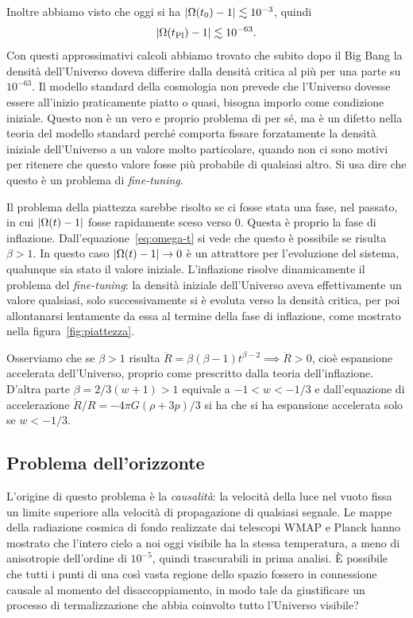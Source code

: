 Inoltre abbiamo visto che oggi si ha \(\lvert\Omega(t_{0}) - 1\rvert \lesssim
10^{-3}\), quindi
\begin{equation}
  \lvert\Omega(t_{\textup{Pl}}) - 1\rvert \lesssim 10^{-63}.
\end{equation}
Con questi approssimativi calcoli abbiamo trovato che subito dopo il Big Bang la
densità dell'Universo doveva differire dalla densità critica al più per una
parte su \(10^{-63}\).  Il modello standard della cosmologia non prevede che
l'Universo dovesse essere all'inizio praticamente piatto o quasi, bisogna
imporlo come condizione iniziale.  Questo non è un vero e proprio problema di
per sé, ma è un difetto nella teoria del modello standard perché comporta
fissare forzatamente la densità iniziale dell'Universo a un valore molto
particolare, quando non ci sono motivi per ritenere che questo valore fosse più
probabile di qualsiasi altro.  Si usa dire che questo è un problema di
\emph{fine-tuning}.

Il problema della piattezza sarebbe risolto se ci fosse stata una fase, nel
passato, in cui \(\lvert\Omega(t) - 1\rvert\) fosse rapidamente sceso verso \(0\).
Questa è proprio la fase di inflazione.  Dall'equazione~\eqref{eq:omega-t} si
vede che questo è possibile se risulta \(\beta > 1\).  In questo caso
\(\lvert\Omega(t) - 1\rvert \to 0\) è un attrattore per l'evoluzione del sistema,
qualunque sia stato il valore iniziale.  L'inflazione risolve dinamicamente il
problema del \emph{fine-tuning}: la densità iniziale dell'Universo aveva
effettivamente un valore qualsiasi, solo successivamente si è evoluta verso la
densità critica, per poi allontanarsi lentamente da essa al termine della fase
di inflazione, come mostrato nella figura~\ref{fig:piattezza}.

Osserviamo che se \(\beta>1\) risulta \(\ddot{R} = \beta(\beta-1)t^{\beta-2}
\implies \ddot{R} > 0\), cioè espansione accelerata dell'Universo, proprio come
prescritto dalla teoria dell'inflazione.  D'altra parte \(\beta = 2/3(w+1)>1\)
equivale a \(-1 < w < -1/3\) e dall'equazione di accelerazione
\(\ddot{R}/R=-4\pi G(\rho+3p)/3\) si ha che si ha espansione accelerata solo se
\(w < -1/3\).

\subsection{Problema dell'orizzonte}
\label{sec:problema-orizzonte}

L'origine di questo problema è la \emph{causalità}: la velocità della luce nel
vuoto fissa un limite superiore alla velocità di propagazione di qualsiasi
segnale.  Le mappe della radiazione cosmica di fondo realizzate dai telescopi
WMAP e Planck hanno mostrato che l'intero cielo a noi oggi visibile ha la stessa
temperatura, a meno di anisotropie dell'ordine di \(10^{-5}\), quindi
trascurabili in prima analisi.  È possibile che tutti i punti di una così vasta
regione dello spazio fossero in connessione causale al momento del
disaccoppiamento, in modo tale da giustificare un processo di termalizzazione
che abbia coinvolto tutto l'Universo visibile?

